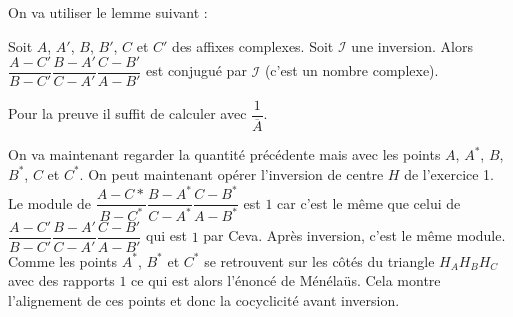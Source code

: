 \begin{sol}

On va utiliser le lemme suivant :

\begin{lem}
Soit $A$, $A'$, $B$, $B'$, $C$ et $C'$ des affixes complexes. Soit $\mathcal I$ une inversion. Alors $\dfrac{A-C'}{B-C'}\dfrac{B-A'}{C-A'}\dfrac{C-B'}{A-B'}$ est conjugué par $\mathcal I$ (c'est un nombre complexe).
\end{lem}

\begin{preuve}
Pour la preuve il suffit de calculer avec $\dfrac 1{\overline A}$.
\end{preuve}

On va maintenant regarder la quantité précédente mais avec les points $A$, $A^*$, $B$, $B^*$, $C$ et $C^*$. On peut maintenant opérer l'inversion de centre $H$ de l'exercice 1. Le module de $\dfrac{A-C*}{B-C^*}\dfrac{B-A^*}{C-A^*}\dfrac{C-B^*}{A-B^*}$ est $1$ car c'est le même que celui de $\dfrac{A-C'}{B-C'}\dfrac{B-A'}{C-A'}\dfrac{C-B'}{A-B'}$ qui est $1$ par Ceva. Après inversion, c'est le même module. Comme les points $A^*$, $B^*$ et $C^*$ se retrouvent sur les côtés du triangle $H_AH_BH_C$ avec des rapports $1$ ce qui est alors l'énoncé de Ménélaüs. Cela montre l'alignement de ces points et donc la cocyclicité avant inversion.
\end{sol}

